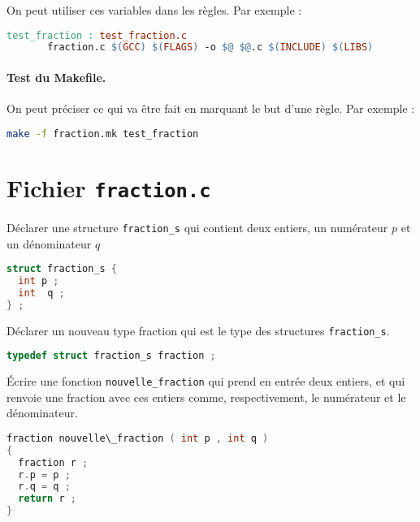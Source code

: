 On peut utiliser ces variables dans les règles. Par exemple :
\begin{lstlisting}[language=make]
test_fraction : test_fraction.c
       fraction.c $(GCC) $(FLAGS) -o $@ $@.c $(INCLUDE) $(LIBS) 
\end{lstlisting}


\paragraph{Test du Makefile.} On peut préciser ce qui va être fait en
marquant le but d’une règle. Par exemple :
\begin{lstlisting}[language=bash]
  make -f fraction.mk test_fraction
\end{lstlisting}

\section{Fichier \texttt{fraction.c}}


\question Déclarer une structure \texttt{fraction\_s} qui contient
deux entiers, un numérateur \(p\) et un dénominateur \(q\)

\begin{solution}
  \begin{lstlisting}[language=C]
struct fraction_s {
  int p ;
  int  q ;
} ;
  \end{lstlisting}
\end{solution}

\question Déclarer un nouveau type fraction qui est le type des structures \texttt{fraction\_s}.
\begin{solution}
  \begin{lstlisting}[language=C]
typedef struct fraction_s fraction ;
\end{lstlisting}
\end{solution}

\question Écrire une fonction \texttt{nouvelle\_fraction} qui prend en
entrée deux entiers, et qui renvoie une fraction avec ces entiers
comme, respectivement, le numérateur et le dénominateur.  

\begin{solution}
  \begin{lstlisting}[language=C]
fraction nouvelle\_fraction ( int p , int q )
{
  fraction r ;
  r.p = p ;
  r.q = q ;
  return r ;
}
\end{lstlisting}
\end{solution}

